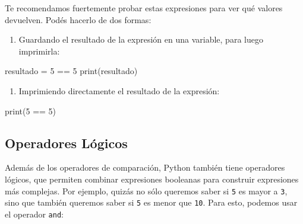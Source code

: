 \documentclass[
  letterpaper,
  DIV=11,
  numbers=noendperiod]{scrreprt}
\newenvironment{Shaded}{\begin{snugshade}}{\end{snugshade}}
\newcommand{\BuiltInTok}[1]{\textcolor[rgb]{0.00,0.23,0.31}{#1}}
\newcommand{\DecValTok}[1]{\textcolor[rgb]{0.68,0.00,0.00}{#1}}
\newcommand{\NormalTok}[1]{\textcolor[rgb]{0.00,0.23,0.31}{#1}}
\newcommand{\OperatorTok}[1]{\textcolor[rgb]{0.37,0.37,0.37}{#1}}
\providecommand{\tightlist}{%
  \setlength{\itemsep}{0pt}\setlength{\parskip}{0pt}}\usepackage{longtable,booktabs,array}
\begin{document}
\begin{tcolorbox}[enhanced jigsaw, opacitybacktitle=0.6, toptitle=1mm, toprule=.15mm, arc=.35mm, breakable, bottomrule=.15mm, opacityback=0, leftrule=.75mm, rightrule=.15mm, title=\textcolor{quarto-callout-tip-color}{\faLightbulb}\hspace{0.5em}{Tip}, left=2mm, bottomtitle=1mm, colframe=quarto-callout-tip-color-frame, colback=white, titlerule=0mm, coltitle=black, colbacktitle=quarto-callout-tip-color!10!white]

Te recomendamos fuertemente probar estas expresiones para ver qué
valores devuelven. Podés hacerlo de dos formas:

\begin{enumerate}
\def\labelenumi{\arabic{enumi}.}
\tightlist
\item
  Guardando el resultado de la expresión en una variable, para luego
  imprimirla:
\end{enumerate}

\begin{Shaded}
\begin{Highlighting}[]
\NormalTok{resultado }\OperatorTok{=} \DecValTok{5} \OperatorTok{==} \DecValTok{5}
\BuiltInTok{print}\NormalTok{(resultado)}
\end{Highlighting}
\end{Shaded}

\begin{enumerate}
\def\labelenumi{\arabic{enumi}.}
\setcounter{enumi}{1}
\tightlist
\item
  Imprimiendo directamente el resultado de la expresión:
\end{enumerate}

\begin{Shaded}
\begin{Highlighting}[]
\BuiltInTok{print}\NormalTok{(}\DecValTok{5} \OperatorTok{==} \DecValTok{5}\NormalTok{)}
\end{Highlighting}
\end{Shaded}

\end{tcolorbox}

\subsection{Operadores Lógicos}\label{operadores-luxf3gicos}

Además de los operadores de comparación, Python también tiene operadores
lógicos, que permiten combinar expresiones booleanas para construir
expresiones más complejas. Por ejemplo, quizás no sólo queremos saber si
\texttt{5} es mayor a \texttt{3}, sino que también queremos saber si
\texttt{5} es menor que \texttt{10}. Para esto, podemos usar el operador
\texttt{and}:
\end{document}
